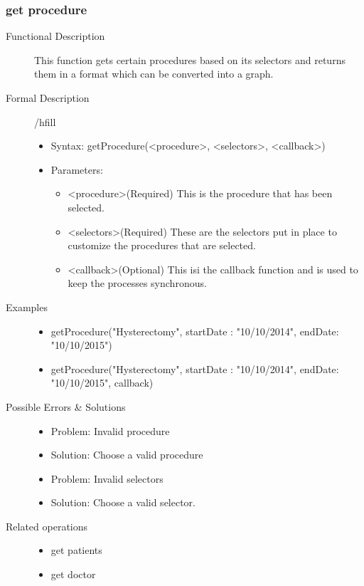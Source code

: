 \documentclass[a4paper]{article}
\begin{document}
\subsubsection{get procedure}
\begin{description}
\item[Functional Description] This function gets certain procedures based on its selectors and returns them in a format which can be converted into a graph.
\item[Formal Description]/hfill
\begin{itemize}
	\item Syntax: getProcedure(<procedure>, <selectors>, <callback>)\\
	\item Parameters:
		\begin{itemize}
			\item <procedure>(Required) This is the procedure that has been selected.
			\item <selectors>(Required) These are the selectors put in place to customize the procedures that are selected.
			\item <callback>(Optional) This isi the callback function and is used to keep the processes synchronous.
		\end{itemize}
\end{itemize}
\item[Examples]\hfill
\begin{itemize}
	\item getProcedure("Hysterectomy", {startDate : "10/10/2014", endDate: "10/10/2015"})
	\item getProcedure("Hysterectomy", {startDate : "10/10/2014", endDate: "10/10/2015"}, callback)
\end{itemize}
\item[Possible Errors \& Solutions]
\begin{itemize}
	\item Problem: Invalid procedure
	\item Solution: Choose a valid procedure
	\item Problem: Invalid selectors
	\item Solution: Choose a valid selector.
\end{itemize}
\item[Related operations] \hfill
\begin{itemize}
	\item get patients
	\item get doctor
\end{itemize}
\end{description}
\end{document}
